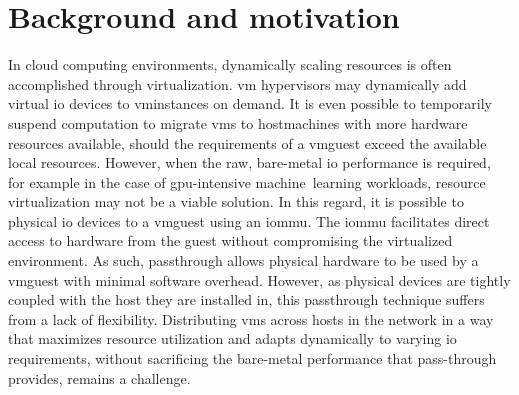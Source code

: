 \section{Background and motivation}\label{sec:motivation}
In cloud computing environments, dynamically scaling resources is often accomplished through virtualization. 
%
\Gls{vm} \glspl{hypervisor} may dynamically add virtual \gls{io} devices to \glspl{vminstance} on demand.
%
It is even possible to temporarily suspend computation to migrate \glspl{vm} to \glspl{hostmachine} with more hardware resources available, should the requirements of a \gls{vmguest} exceed the available local resources.
%
However, when the raw, bare-metal \gls{io} performance is required, for example in the case of \gls{gpu}-intensive machine~learning workloads, resource virtualization may not be a viable solution.
%
In this regard, it is possible to  physical \gls{io} devices to a \gls{vmguest} using an \gls{iommu}.
%
The \gls{iommu} facilitates direct access to hardware from the \gls{guest} without compromising the virtualized environment.
%
As such, \gls{passthrough} allows physical hardware to be used by a \gls{vmguest} with minimal software overhead.
%
However, as physical devices are tightly coupled with the \gls{host} they are installed in, this \gls{passthrough} technique suffers from a lack of flexibility.
%
Distributing \glspl{vm} across \glspl{host} in the network in a way that maximizes resource utilization and adapts dynamically to varying \gls{io} requirements, without sacrificing the bare-metal performance that pass-through provides, remains a challenge.



